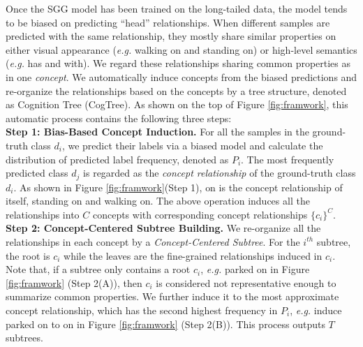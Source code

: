 \documentclass{article}
\begin{document}
Once the SGG model has been trained on the long-tailed data, the model tends to be biased on predicting ``head'' relationships. When different samples are predicted with the same relationship, they mostly share similar properties on either visual appearance (\textit{e.g.} {\ttfamily walking on} and {\ttfamily standing on}) or high-level semantics (\textit{e.g.} {\ttfamily has} and {\ttfamily with}).
We regard these relationships sharing common properties as in one \textit{concept}.  
We automatically induce concepts from the biased predictions and re-organize the relationships based on the concepts by a tree structure, denoted as Cognition Tree (CogTree). As shown on the top of Figure \ref{fig:framwork}, this automatic process contains the following three steps: \\
\textbf{Step 1: Bias-Based Concept Induction.} For all the samples in the ground-truth class $d_i$, we predict their labels via a biased model and calculate the distribution of predicted label frequency, denoted as $P_i$. The most frequently predicted class $d_j$ is regarded as the \textit{concept relationship} of the ground-truth class $d_i$. As shown in Figure \ref{fig:framwork}(Step 1), {\ttfamily on} is the concept relationship of itself, {\ttfamily standing on} and {\ttfamily walking on}. The above operation induces all the relationships into $C$ concepts with corresponding concept relationships  $\{c_i\}^C$.  
\\
\textbf{Step 2: Concept-Centered Subtree Building.} We re-organize all the relationships in each concept by a \textit{Concept-Centered Subtree}. For the $i^{th}$ subtree, the root is $c_i$ while the leaves are the fine-grained relationships induced in $c_i$. Note that, if a subtree only contains a root $c_i$, \textit{e.g.} {\ttfamily parked on} in Figure \ref{fig:framwork} (Step 2(A)), then $c_i$ is considered not  representative enough to summarize common properties. We further induce it to the most approximate concept relationship, which has  the second highest frequency in $P_i$, \textit{e.g.} induce {\ttfamily parked on} to {\ttfamily on} in Figure \ref{fig:framwork} (Step 2(B)). This process outputs $T$ subtrees. \\
\end{document}
